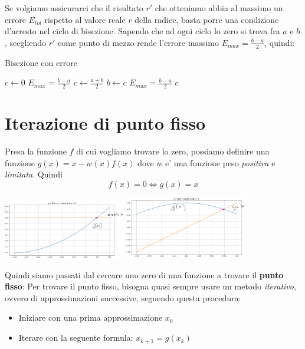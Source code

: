 \documentclass{report}
\begin{document}
\vspace{3mm}
Se volgiamo assicurarci che il risultato $ r' $ che otteniamo abbia al massimo un errore $ E_{tol} $ rispetto al valore reale $ r $ della radice, basta porre una condizione d'arresto nel ciclo di bisezione. Sapendo che ad ogni ciclo lo zero si trova fra $ a $ e $ b $, scegliendo $ r' $ come punto di mezzo rende l'errore massimo $ E_{max} = \frac{b-a}{2} $, quindi:

\vspace{3mm}
\begin{algorithm}[H]
\caption{Bisezione con errore}
\SetAlgoLined
\SetNoFillComment
\vspace{3mm}
$c \leftarrow 0$\;
$ E_{max} = \frac{b-a}{2} $\;
 {
    $ c \gets \frac{a+b}{2} $\;
     {
      $ b \gets c $
    }
    $ E_{max} = \frac{b-a}{2} $
}
\Return $ c $
\end{algorithm}

\section{Iterazione di punto fisso}
Presa la funzione $ f $ di cui vogliamo trovare lo zero, possiamo definire una funzione $ g(x) = x-w(x)f(x) $ dove $ w $ e' una funzione peso \textit{positiva} e \textit{limitata}. Quindi
\[
  f(x) = 0 \iff g(x) = x
\]
\begin{center}
  \includegraphics[width=0.4\textwidth]{img/2024-09-28-13-06-45.png}
  \includegraphics[width=0.4\textwidth]{img/2024-09-28-13-07-12.png}
\end{center}
Quindi siamo passati dal cercare uno zero di una funzione a trovare il \textbf{punto fisso}:
Per trovare il punto fisso, bisogna quasi sempre usare un metodo \textit{iterativo}, ovvero di approssimazioni successive, seguendo questa procedura:
\begin{itemize}
\item Iniziare con una prima approssimazione $ x_0 $
\item Iterare con la seguente formula: $ x_{k+1} = g(x_{k}) $
\end{itemize}
\end{document}
